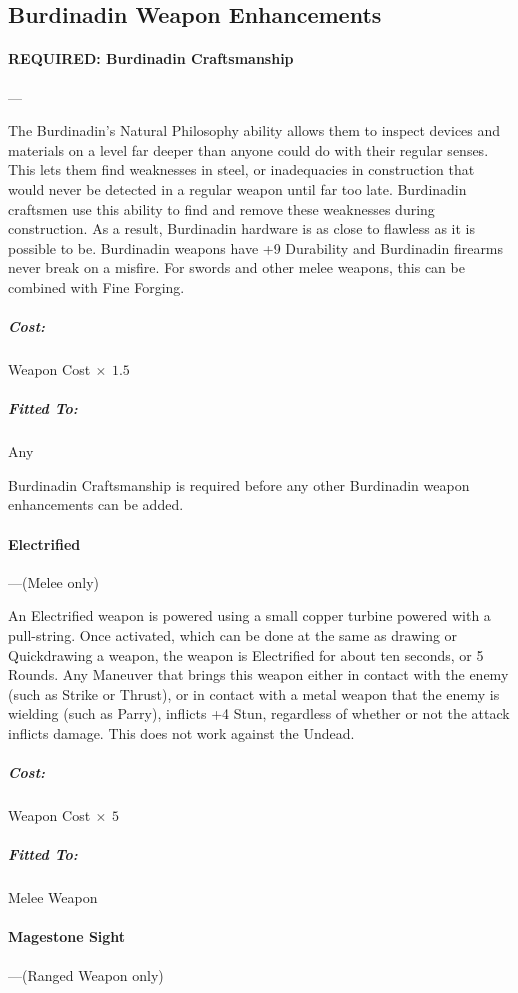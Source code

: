 \documentclass[oneside,11pt,english]{book}
\begin{document}
\subsection{Burdinadin Weapon Enhancements}
\paragraph{REQUIRED: Burdinadin Craftsmanship}---\quad [+150\%]

The Burdinadin’s Natural Philosophy ability allows them to inspect devices and materials on a level far deeper than anyone could do with their regular senses. This lets them find weaknesses in steel, or 
inadequacies in construction that would never be detected in a regular weapon until far too late. 
Burdinadin craftsmen use this ability to find and remove these weaknesses during construction. 
As a result, Burdinadin hardware is as close to flawless as it is possible to be. Burdinadin weapons have 
+9 Durability and Burdinadin firearms never break on a misfire. For swords and other melee weapons, 
this can be combined with Fine Forging.
\vspace{-15pt}\subparagraph{Cost:} Weapon Cost$~\times~1.5$
\vspace{-15pt}\subparagraph{Fitted To:} Any

Burdinadin Craftsmanship is required before any other Burdinadin weapon enhancements can be added.

\paragraph{Electrified}---\quad[+500\%] \quad (Melee only)

An Electrified weapon is powered using a small copper turbine powered with a pull-string. Once 
activated, which can be done at the same as drawing or Quickdrawing a weapon, the weapon is Electrified 
for about ten seconds, or 5 Rounds. Any Maneuver that brings this weapon either in contact with the 
enemy (such as Strike or Thrust), or in contact with a metal weapon that the enemy is wielding (such as Parry), inflicts +4 Stun, regardless of whether or not the attack inflicts damage. This does not work against the Undead. 

\vspace{-15pt}\subparagraph{Cost:} Weapon Cost$~\times~5$
\vspace{-15pt}\subparagraph{Fitted To:} Melee Weapon

\paragraph{Magestone Sight}---\quad[10 gp] \quad (Ranged Weapon only)
\end{document}
